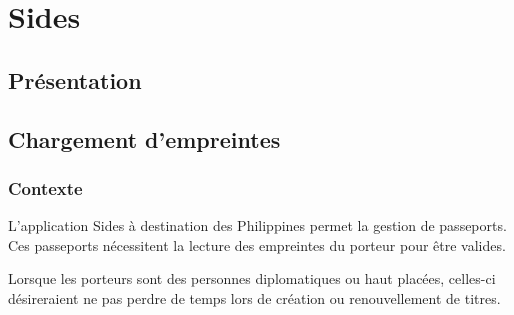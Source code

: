 \cleardoublepage

\chapter{Sides}


\section{Présentation}




\section{Chargement d'empreintes}


\subsection{Contexte}

L'application Sides à destination des Philippines permet la gestion de passeports.
Ces passeports nécessitent la lecture des empreintes du porteur pour être valides.

Lorsque les porteurs sont des personnes diplomatiques ou haut placées, celles-ci désireraient ne pas perdre de temps lors de création ou renouvellement de titres.



